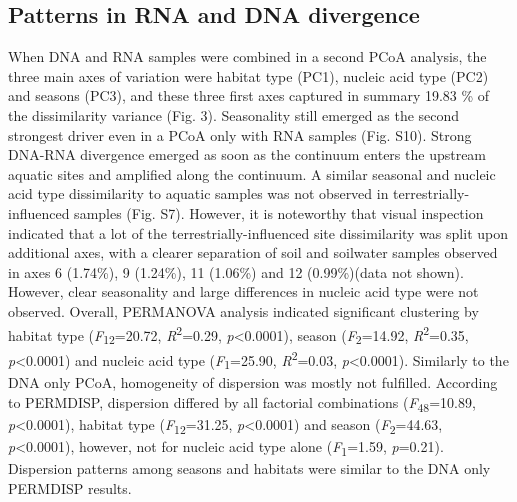 \documentclass[12pt,a4paper]{article} %
\begin{document}
\subsection*{Patterns in RNA and DNA divergence}
When DNA and RNA samples were combined in a second PCoA analysis, the three main axes of variation were habitat type (PC1), nucleic acid type (PC2) and seasons (PC3), and these three first axes captured in summary 19.83 \% of the dissimilarity variance (Fig. 3). Seasonality still emerged as the second strongest driver even in a PCoA only with RNA samples (Fig. S10). Strong DNA-RNA divergence emerged as soon as the continuum enters the upstream aquatic sites and amplified along the continuum. A similar seasonal and nucleic acid type dissimilarity to aquatic samples was not observed in terrestrially-influenced samples (Fig. S7). However, it is noteworthy that visual inspection indicated that a lot of the terrestrially-influenced site dissimilarity was split upon additional axes, with a clearer separation of soil and soilwater samples observed in axes 6 (1.74\%), 9 (1.24\%), 11 (1.06\%) and 12 (0.99\%)(data not shown). However, clear seasonality and large differences in nucleic acid type were not observed. Overall, PERMANOVA analysis indicated significant clustering by habitat type (\textit{F}\textsubscript{12}=20.72, \textit{R}\textsuperscript{2}=0.29, \textit{p}<0.0001), season (\textit{F}\textsubscript{2}=14.92, \textit{R}\textsuperscript{2}=0.35, \textit{p}<0.0001) and nucleic acid type (\textit{F}\textsubscript{1}=25.90, \textit{R}\textsuperscript{2}=0.03, \textit{p}<0.0001). Similarly to the DNA only PCoA, homogeneity of dispersion was mostly not fulfilled. According to PERMDISP, dispersion differed by all factorial combinations (\textit{F}\textsubscript{48}=10.89, \textit{p}<0.0001), habitat type (\textit{F}\textsubscript{12}=31.25, \textit{p}<0.0001) and season (\textit{F}\textsubscript{2}=44.63, \textit{p}<0.0001), however, not for nucleic acid type alone (\textit{F}\textsubscript{1}=1.59, \textit{p}=0.21). Dispersion patterns among seasons and habitats were similar to the DNA only PERMDISP results.
\end{document}
